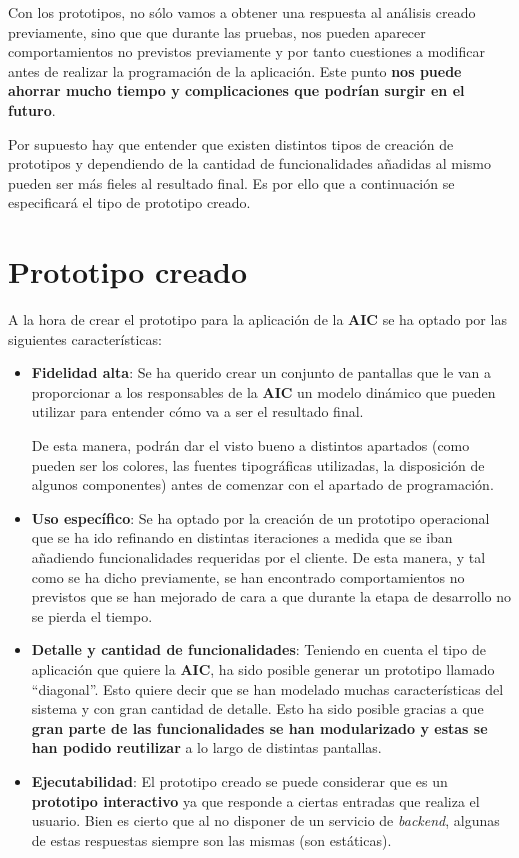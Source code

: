 \documentclass{\ClassPath/viu-tfm-template}
\begin{document}
Con los prototipos, no sólo vamos a obtener una respuesta al análisis creado previamente, sino que que durante las pruebas, nos pueden aparecer comportamientos no previstos previamente y por tanto cuestiones a modificar antes de realizar la programación de la aplicación. Este punto \textbf{nos puede ahorrar mucho tiempo y complicaciones que podrían surgir en el futuro}.

Por supuesto hay que entender que existen distintos tipos de creación de prototipos y dependiendo de la cantidad de funcionalidades añadidas al mismo pueden ser más fieles al resultado final. Es por ello que a continuación se especificará el tipo de prototipo creado.


\section{Prototipo creado}

A la hora de crear el prototipo para la aplicación de la \textbf{AIC} se ha optado por las siguientes características:

\vspace{-1em}
\begin{itemize}
    \item \textbf{Fidelidad alta}: Se ha querido crear un conjunto de pantallas que le van a proporcionar a los responsables de la \textbf{AIC} un modelo dinámico que pueden utilizar para entender cómo va a ser el resultado final.

    De esta manera, podrán dar el visto bueno a distintos apartados (como pueden ser los colores, las fuentes tipográficas utilizadas, la disposición de algunos componentes) antes de comenzar con el apartado de programación.

    \item \textbf{Uso específico}: Se ha optado por la creación de un prototipo operacional que se ha ido refinando en distintas iteraciones a medida que se iban añadiendo funcionalidades requeridas por el cliente. De esta manera, y tal como se ha dicho previamente, se han encontrado comportamientos no previstos que se han mejorado de cara a que durante la etapa de desarrollo no se pierda el tiempo.

    \item \textbf{Detalle y cantidad de funcionalidades}: Teniendo en cuenta el tipo de aplicación que quiere la \textbf{AIC}, ha sido posible generar un prototipo llamado “diagonal”. Esto quiere decir que se han modelado muchas características del sistema y con gran cantidad de detalle. Esto ha sido posible gracias a que \textbf{gran parte de las funcionalidades se han modularizado y estas se han podido reutilizar} a lo largo de distintas pantallas.

    \item \textbf{Ejecutabilidad}: El prototipo creado se puede considerar que es un \textbf{prototipo interactivo} ya que responde a ciertas entradas que realiza el usuario. Bien es cierto que al no disponer de un servicio de \textit{backend}, algunas de estas respuestas siempre son las mismas (son estáticas).
\end{itemize}
\end{document}
